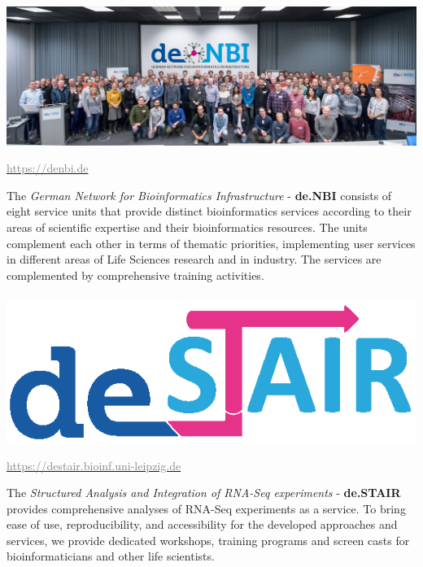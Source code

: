 \documentclass[x11names, svgnames]{beamer}
\begin{document}
%
%
%
\begin{frame}
  \frametitle{\one}
  \begin{center}
    \includegraphics[scale=0.15]{images/people_denbi}
  \end{center}
  \begin{center}
    \footnotesize{\href{https://denbi.de}{\textcolor{gray}{https://denbi.de}}}
  \end{center}
  \begin{center}
    \small{
  The \textit{German Network for Bioinformatics Infrastructure} - \textbf{de.NBI} consists of eight service units that provide distinct bioinformatics services according to their areas of scientific expertise and their bioinformatics resources. The units complement each other in terms of thematic priorities, implementing user services in different areas of Life Sciences research and in industry. The services are complemented by comprehensive training activities.}
  \end{center}
\end{frame}
\begin{frame}
  \frametitle{\one}
  \begin{center}
    \includegraphics[scale=0.3]{images/logo_destair}
  \end{center}
  \begin{center}
    \footnotesize{\href{https://destair.bioinf.uni-leipzig.de}{\textcolor{gray}{https://destair.bioinf.uni-leipzig.de}}}
  \end{center}
  \begin{center}
    \vspace{2em}
    \small{
    The \textit{Structured Analysis and Integration of RNA-Seq experiments} - \textbf{de.STAIR} provides comprehensive analyses of RNA-Seq experiments as a service. To bring ease of use, reproducibility, and accessibility for the developed approaches and services, we provide dedicated workshops, training programs and screen casts for bioinformaticians and other life scientists.}
  \end{center}
\end{frame}
\end{document}

